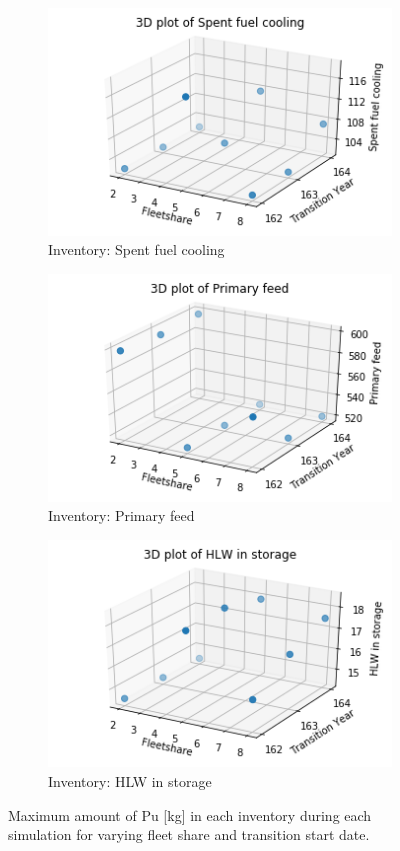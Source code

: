 \begin{figure}[H]
    \centering
    \begin{subfigure}[t]{\textwidth}
    \centering
        \includegraphics[width=0.4\linewidth]{figures/3d_sfc} 
        \caption{Inventory: Spent fuel cooling}
        \label{fig:3d_sfc}
    \end{subfigure}
    \begin{subfigure}[t]{0.4\textwidth}
        \centering
        \includegraphics[width=\linewidth]{figures/3d_pf} 
        \caption{Inventory: Primary feed}
	    \label{fig:3d_pf}
    \end{subfigure}
    \begin{subfigure}[t]{0.4\textwidth}
        \centering
        \includegraphics[width=\linewidth]{figures/3d_hlw} 
        \caption{Inventory: HLW in storage}
        \label{fig:3d_hlw}
    \end{subfigure}
    \caption{Maximum amount of Pu [kg] in each inventory during each simulation for varying fleet share and transition start date.}
\end{figure}

